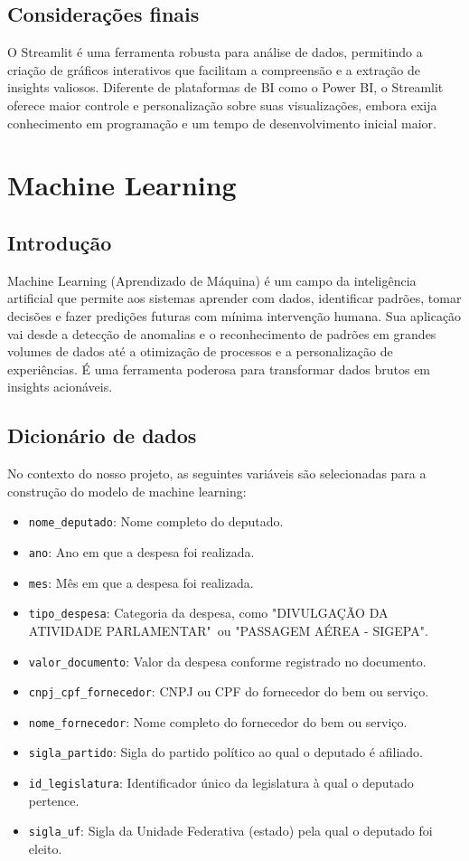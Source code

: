 \documentclass[12pt, a4paper]{article}
\begin{document}
\subsection{Considerações finais}

O Streamlit é uma ferramenta robusta para análise de dados, permitindo a criação de gráficos interativos que facilitam a compreensão e a extração de insights valiosos. Diferente de plataformas de BI como o Power BI, o Streamlit oferece maior controle e personalização sobre suas visualizações, embora exija conhecimento em programação e um tempo de desenvolvimento inicial maior.

\section{Machine Learning}
\subsection{Introdução}

Machine Learning (Aprendizado de Máquina) é um campo da inteligência artificial que permite aos sistemas aprender com dados, identificar padrões, tomar decisões e fazer predições futuras com mínima intervenção humana. Sua aplicação vai desde a detecção de anomalias e o reconhecimento de padrões em grandes volumes de dados até a otimização de processos e a personalização de experiências. É uma ferramenta poderosa para transformar dados brutos em insights acionáveis.

\subsection{Dicionário de dados}

No contexto do nosso projeto, as seguintes variáveis são selecionadas para a construção do modelo de machine learning:

\begin{itemize}
	\item \texttt{nome\_deputado}: Nome completo do deputado.
	\item \texttt{ano}: Ano em que a despesa foi realizada.
	\item \texttt{mes}: Mês em que a despesa foi realizada.
	\item \texttt{tipo\_despesa}: Categoria da despesa, como "DIVULGAÇÃO DA ATIVIDADE PARLAMENTAR"\ ou  "PASSAGEM AÉREA - SIGEPA".
	\item \texttt{valor\_documento}: Valor da despesa conforme registrado no documento.
	\item \texttt{cnpj\_cpf\_fornecedor}: CNPJ ou CPF do fornecedor do bem ou serviço.
	\item \texttt{nome\_fornecedor}: Nome completo do fornecedor do bem ou serviço.
	\item \texttt{sigla\_partido}: Sigla do partido político ao qual o deputado é afiliado.
	\item \texttt{id\_legislatura}: Identificador único da legislatura à qual o deputado pertence.
	\item \texttt{sigla\_uf}: Sigla da Unidade Federativa (estado) pela qual o deputado foi eleito.
\end{itemize}
\end{document}
